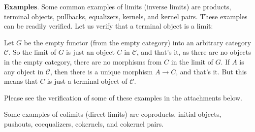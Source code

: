 \documentclass[12pt]{article}
\newtheorem*{warning}{Warning}
\newcommand{\Univ}{\mathscr{U}}
\begin{document}
\textbf{Examples}.  Some common examples of limits (inverse limits) are products, terminal objects, pullbacks, equalizers, kernels, and kernel pairs.  These examples can be readily verified.  Let us verify that a terminal object is a limit:  

Let $G$ be the empty functor (from the empty category) into an arbitrary category $\mathcal{C}$.  So the limit of $G$ is just an object $C$ in $\mathcal{C}$, and that's it, as there are no objects in the empty category, there are no morphisms from $C$ in the limit of $G$.  If $A$ is any object in $\mathcal{C}$, then there is a unique morphism $A\to C$, and that's it.  But this means that $C$ is just a terminal object of $\mathcal{C}$.

Please see the verification of some of these examples in the attachments below.

Some examples of colimits (direct limits) are coproducts, initial objects, pushouts, coequalizers, cokernels, and cokernel pairs.



\end{document}
